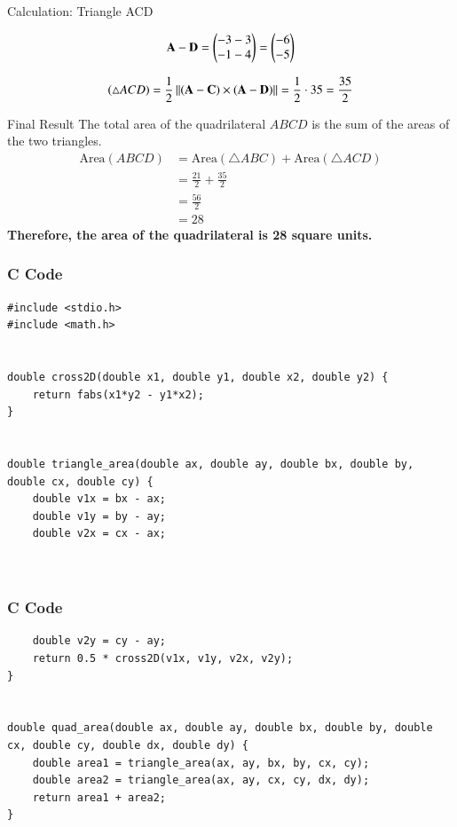 \documentclass{beamer}
\begin{document}
\begin{frame}{Calculation: Triangle ACD}

\begin{align}
\vec{A}-\vec{D}
=\myvec{-3-3 \\ -1-4} = \myvec{-6 \\ -5}  
\end{align}


\begin{align}
(\triangle ACD)=\frac{1}{2}\norm{(\vec{A}-\vec{C}) \times (\vec{A}-\vec{D})}=\frac12\cdot 35=\frac{35}{2}
\end{align}

\end{frame}

\begin{frame}{Final Result}
The total area of the quadrilateral $ABCD$ is the sum of the areas of the two triangles.
\begin{align}
    \text{Area}(ABCD) &= \text{Area}(\triangle ABC) + \text{Area}(\triangle ACD) \\
    &= \frac{21}{2} + \frac{35}{2} \\
    &= \frac{56}{2} \\
    &= 28
\end{align}
\vfill
\textbf{Therefore, the area of the quadrilateral is 28 square units.}
\end{frame}


\begin{frame}[fragile]
    \frametitle{C Code}
    \begin{lstlisting}
#include <stdio.h>
#include <math.h>


double cross2D(double x1, double y1, double x2, double y2) {
    return fabs(x1*y2 - y1*x2);
}


double triangle_area(double ax, double ay, double bx, double by, double cx, double cy) {
    double v1x = bx - ax;
    double v1y = by - ay;
    double v2x = cx - ax;



    \end{lstlisting}
\end{frame}

\begin{frame}[fragile]
    \frametitle{C Code}
    \begin{lstlisting}
    double v2y = cy - ay;
    return 0.5 * cross2D(v1x, v1y, v2x, v2y);
}


double quad_area(double ax, double ay, double bx, double by, double cx, double cy, double dx, double dy) {
    double area1 = triangle_area(ax, ay, bx, by, cx, cy);
    double area2 = triangle_area(ax, ay, cx, cy, dx, dy);
    return area1 + area2;
}

    \end{lstlisting}
\end{frame}
\end{document}

